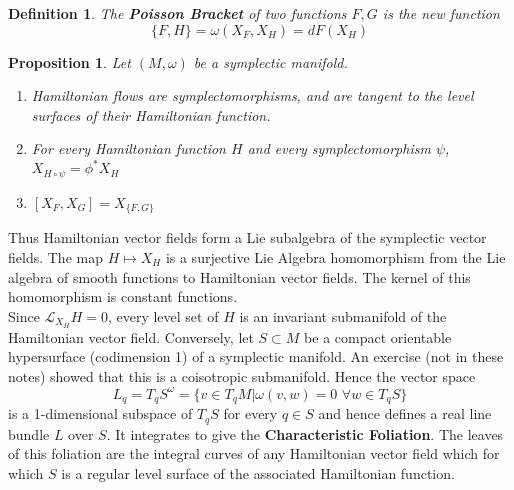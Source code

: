 \documentclass{article}
\newtheorem{defn}{Definition}
\newtheorem{prop}{Proposition}
\begin{document}
\begin{defn}
The \textbf{Poisson Bracket} of two functions $F,G$ is the new function
\begin{equation}
    \{F,H\} = \omega(X_F, X_H) = dF(X_H)
\end{equation}
\end{defn}


\begin{prop}
Let $(M,\omega)$ be a symplectic manifold.
\begin{enumerate}
    \item Hamiltonian flows are symplectomorphisms, and are tangent to the level surfaces of their Hamiltonian function.
    \item For every Hamiltonian function $H$ and every symplectomorphism $\psi$, $X_{H \circ \psi}=\phi^* X_H$
    \item $[X_F,X_G]=X_{\{F,G\}}$
\end{enumerate}
\end{prop}

\indent Thus Hamiltonian vector fields form a Lie subalgebra of the symplectic vector fields. The map $H \mapsto X_H$ is a surjective Lie Algebra homomorphism from the Lie algebra of smooth functions to Hamiltonian vector fields. The kernel of this homomorphism is constant functions.\\
\indent Since $\mathcal{L}_{X_H}H=0$, every level set of $H$ is an invariant submanifold of the Hamiltonian vector field. Conversely, let $S \subset M$ be a compact orientable hypersurface (codimension 1) of a symplectic manifold. An exercise (not in these notes) showed that this is a coisotropic submanifold. Hence the vector space
\begin{equation}
    L_q = T_q S^{\omega} = \{ v \in T_qM \vert \omega (v,w) = 0 \hspace{4pt} \forall w \in T_q S\}
\end{equation}
is a 1-dimensional subspace of $T_qS$ for every $q \in S$ and hence defines a real line bundle $L$ over $S$. It integrates to give the \textbf{Characteristic Foliation}. The leaves of this foliation are the integral curves of any Hamiltonian vector field which for which $S$ is a regular level surface of the associated Hamiltonian function.
\end{document}
